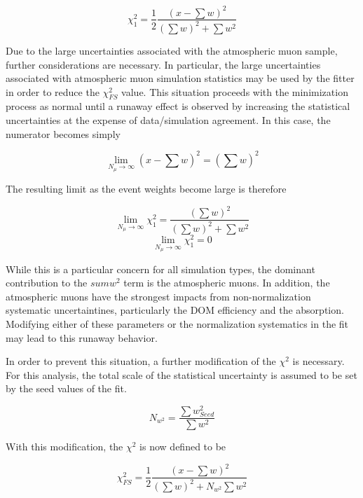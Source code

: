 \label{eqn:mchi2}
\begin{equation}
	\chi^2_{1} =\frac{1}{2}\frac{\left(x-\sum w\right)^2}{\left(\sum{w}\right)^2 + \sum{w^2}}
\end{equation}		

Due to the large uncertainties associated with the atmospheric muon sample, further considerations are necessary.
In particular, the large uncertainties associated with atmospheric muon simulation statistics may be used by the fitter in order to reduce the $\chi^2_{FS}$ value.
This situation proceeds with the minimization process as normal until a runaway effect is observed by increasing the statistical uncertainties at the expense of data/simulation agreement.
In this case, the numerator becomes simply

\label{eqn:mchi2_num}
\begin{equation}
	\lim_{N_{\mu}\rightarrow\infty} \left(x-\sum w\right)^2 = \left(\sum w\right)^2
\end{equation}

The resulting limit as the event weights become large is therefore

\label{eqn:mchi2_lim}
\begin{equation}
	\lim_{N_{\mu}\rightarrow\infty} \chi^2_{1} =  \frac{\left(\sum w\right)^2}{\left(\sum{w}\right)^2 + \sum{w^2}}
\end{equation}
\begin{equation}
	\lim_{N_{\mu}\rightarrow\infty} \chi^2_{1} = 0
\end{equation}


While this is a particular concern for all simulation types, the dominant contribution to the $sum{w^2}$ term is the atmospheric muons. 
In addition, the atmospheric muons have the strongest impacts from non-normalization systematic uncertaintines, particularly the DOM efficiency and the absorption.
Modifying either of these parameters or the normalization systematics in the fit may lead to this runaway behavior.

In order to prevent this situation, a further modification of the $\chi^2$ is necessary.
For this analysis, the total scale of the statistical uncertainty is assumed to be set by the seed values of the fit.

\label{eqn:w2_constant}
\begin{equation}
	N_{w^2} = \frac{\sum{w^2_{Seed}}}{\sum{w^2}}
\end{equation}

With this modification, the $\chi^2$ is now defined to be

\begin{equation}
	\chi^2_{FS} =\frac{1}{2}\frac{\left(x-\sum w\right)^2}{\left(\sum{w}\right)^2 + N_{w^2}\sum{w^2}}
\end{equation}